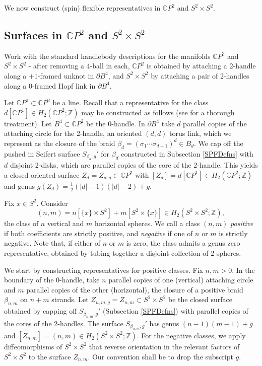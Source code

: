 \documentclass[10pt]{amsart}
\numberwithin{equation}{section}
\theoremstyle{plain}
\theoremstyle{definition}
\theoremstyle{remark}
\begin{document}
We now construct (spin) flexible representatives in $\mathbb{C}P^2$ and $S^2 \times S^2$. 

\subsection{Surfaces in $\mathbb{C}P^2$ and $S^2 \times S^2$} \label{ConstructingSurfaces} Work with the standard handlebody descriptions for the manifolds $\mathbb{C}P^2$ and $S^2 \times S^2$ - after removing a 4-ball in each, $\mathbb{C}P^2$ is obtained by attaching a 2-handle along a $+1$-framed unknot in $\partial B^4$, and $S^2\times S^2$ by attaching a pair of 2-handles along a $0$-framed Hopf link in $\partial B^4$.


Let $\mathbb{C}P^1 \subset \mathbb{C}P^2$ be a line. Recall that a representative for the class $d[\mathbb{C}P^1] \in H_2(\mathbb{C}P^2;\mathbb{Z})$ may be constructed as follows (see \cite{GS} for a thorough treatment). Let $B^4 \subset \mathbb{C}P^2$ be the 0-handle. In $\partial B^4$ take $d$ parallel copies of the attaching circle for the 2-handle, an oriented $(d,d)$ torus link, which we represent as the closure of the  braid $\beta_d = (\sigma_1\cdots\sigma_{d-1})^d \in B_d$. We cap off the pushed in Seifert surface $S_{\beta_d,g}'$ for $\beta_d$ constructed in Subsection \ref{SPFDefns} with $d$ disjoint 2-disks, which are parallel copies of the core of the 2-handle. This yields a closed oriented surface $Z_d = Z_{d,g} \subset \mathbb{C}P^2$ with $[Z_d] = d[\mathbb{C}P^1] \in H_2(\mathbb{C}P^2;\mathbb{Z})$ and genus $g(Z_d) = \frac{1}{2}(|d|-1)(|d|-2)+g.$ \newline



Fix $x \in S^2$. Consider \[(n,m) = n\left [\{x\}\times S^2 \right ]+ m\left [S^2 \times \{x\}\right]\in H_2(S^2 \times S^2;\mathbb{Z}),\] the class of $n$ vertical and $m$ horizontal spheres. We call a class $(n,m)$ \textit{positive} if both coefficients are strictly positive, and \textit{negative} if one of $n$ or $m$ is strictly negative. Note that, if either of $n$ or $m$ is zero, the class admits a genus zero representative, obtained by tubing together a disjoint collection of 2-spheres. 

We start by constructing representatives for positive classes. Fix $n,m >0$. In the boundary of the 0-handle, take $n$ parallel copies of one (vertical) attaching circle and $m$ parallel copies of the other (horizontal), the closure of a positive braid  $\beta_{n,m}$ on $n+m$ strands. Let $Z_{n,m,g} = Z_{n,m} \subset S^2 \times S^2$ be the closed surface obtained by capping off $S_{\beta_{n,m},g}'$ (Subsection \ref{SPFDefns}) with parallel copies of the cores of the 2-handles. The surface $S_{\beta_{n,m},g}'$ has genus $(n-1)(m-1)+g$ and $[Z_{n,m}] = (n,m) \in H_2(S^2 \times S^2;\mathbb{Z})$. For the negative classes, we apply diffeomorphisms of $S^2 \times S^2$ that reverse orientation in the relevant factors of $S^2 \times S^2$ to the surface $Z_{n,m}$. Our convention shall be to drop the subscript $g$. 
\end{document}
